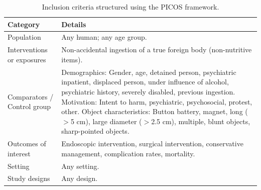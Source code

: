 \begin{table}[h]
\centering
\begin{tabular}{p{5.0cm} p{10.0cm}}
\toprule
\textbf{Category} & \textbf{Details} \\
\midrule

Population & Any human; any age group. \\
\midrule

Interventions or exposures & Non-accidental ingestion of a true foreign body (non-nutritive items). \\
\midrule

Comparators / Control group & 
Demographics: \newline
Gender, age, detained person, psychiatric inpatient, displaced person, under influence of alcohol, psychiatric history, severely disabled, previous ingestion. \newline
Motivation: \newline
Intent to harm, psychiatric, psychosocial, protest, other. \newline
Object characteristics: \newline
Button battery, magnet, long ($>$5 cm), large diameter ($>$2.5 cm), multiple, blunt objects, sharp-pointed objects. \\
\midrule

Outcomes of interest & Endoscopic intervention, surgical intervention, conservative management, complication rates, mortality. \\
\midrule

Setting & Any setting. \\
\midrule

Study designs & Any design. \\
\bottomrule
\end{tabular}
\caption{Inclusion criteria structured using the PICOS framework.}
\label{tab:inclusion-criteria-intro}
\end{table}